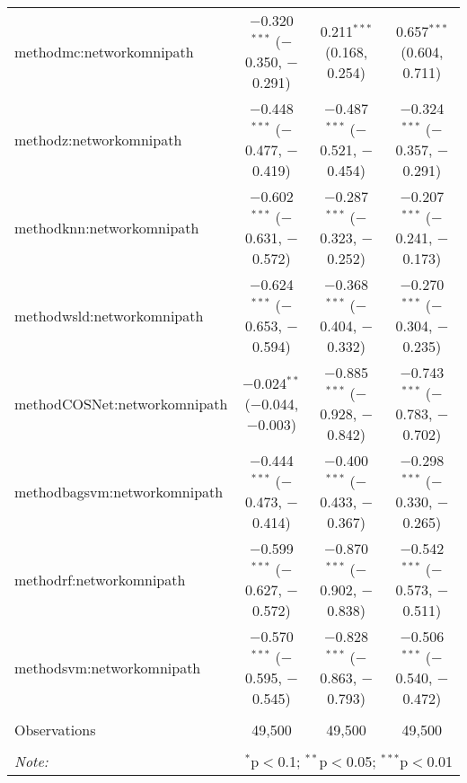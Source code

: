 \begin{table}[!htbp]
\begin{tabular}{@{\extracolsep{5pt}}lccc}
  methodmc:networkomnipath & $-$0.320$^{***}$ ($-$0.350, $-$0.291) & 0.211$^{***}$ (0.168, 0.254) & 0.657$^{***}$ (0.604, 0.711) \\ 
  methodz:networkomnipath & $-$0.448$^{***}$ ($-$0.477, $-$0.419) & $-$0.487$^{***}$ ($-$0.521, $-$0.454) & $-$0.324$^{***}$ ($-$0.357, $-$0.291) \\ 
  methodknn:networkomnipath & $-$0.602$^{***}$ ($-$0.631, $-$0.572) & $-$0.287$^{***}$ ($-$0.323, $-$0.252) & $-$0.207$^{***}$ ($-$0.241, $-$0.173) \\ 
  methodwsld:networkomnipath & $-$0.624$^{***}$ ($-$0.653, $-$0.594) & $-$0.368$^{***}$ ($-$0.404, $-$0.332) & $-$0.270$^{***}$ ($-$0.304, $-$0.235) \\ 
  methodCOSNet:networkomnipath & $-$0.024$^{**}$ ($-$0.044, $-$0.003) & $-$0.885$^{***}$ ($-$0.928, $-$0.842) & $-$0.743$^{***}$ ($-$0.783, $-$0.702) \\ 
  methodbagsvm:networkomnipath & $-$0.444$^{***}$ ($-$0.473, $-$0.414) & $-$0.400$^{***}$ ($-$0.433, $-$0.367) & $-$0.298$^{***}$ ($-$0.330, $-$0.265) \\ 
  methodrf:networkomnipath & $-$0.599$^{***}$ ($-$0.627, $-$0.572) & $-$0.870$^{***}$ ($-$0.902, $-$0.838) & $-$0.542$^{***}$ ($-$0.573, $-$0.511) \\ 
  methodsvm:networkomnipath & $-$0.570$^{***}$ ($-$0.595, $-$0.545) & $-$0.828$^{***}$ ($-$0.863, $-$0.793) & $-$0.506$^{***}$ ($-$0.540, $-$0.472) \\ 
 \hline \\[-1.8ex] 
Observations & 49,500 & 49,500 & 49,500 \\ 
\hline 
\hline \\[-1.8ex] 
\textit{Note:}  & \multicolumn{3}{r}{$^{*}$p$<$0.1; $^{**}$p$<$0.05; $^{***}$p$<$0.01} \\ 
\end{tabular} 
\end{table} 
